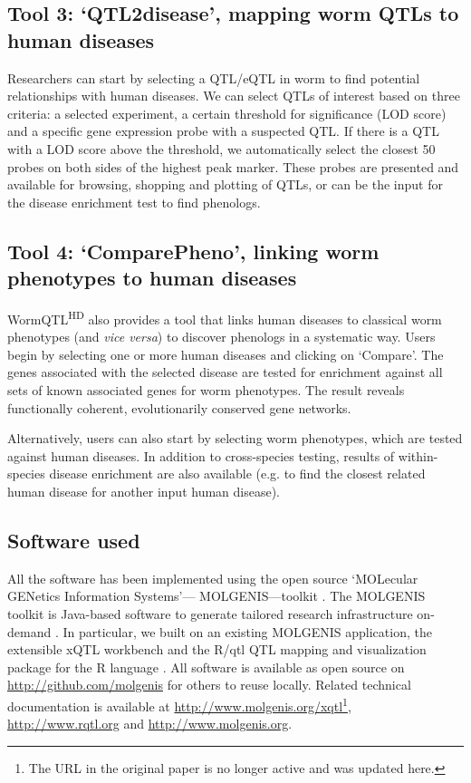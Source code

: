 \subsection[Tool 3: ‘QTL2disease’]{Tool 3: ‘QTL2disease’, mapping worm QTLs to human diseases}
Researchers can start by selecting a QTL/eQTL in worm to find potential relationships with human diseases.
We can select QTLs of interest based on three criteria: a selected experiment, a certain threshold for significance (LOD score) and a specific gene expression probe with a suspected QTL.
If there is a QTL with a LOD score above the threshold, we automatically select the closest 50 probes on both sides of the highest peak marker.
These probes are presented and available for browsing, shopping and plotting of QTLs, or can be the input for the disease enrichment test to find phenologs.

\subsection[Tool 4: ‘ComparePheno’]{Tool 4: ‘ComparePheno’, linking worm phenotypes to human diseases}
WormQTL\textsuperscript{HD} also provides a tool that links human diseases to classical worm phenotypes (and \textsl{vice versa}) to discover phenologs in a systematic way.
Users begin by selecting one or more human diseases and clicking on ‘Compare’.
The genes associated with the selected disease are tested for enrichment against all sets of known associated genes for worm phenotypes. The result reveals functionally coherent, evolutionarily conserved gene networks.

Alternatively, users can also start by selecting worm phenotypes, which are tested against human diseases. In addition to cross-species testing, results of within-species disease enrichment are also available (e.g. to find the closest related human disease for another input human disease).

\subsection{Software used}
All the software has been implemented using the open source ‘MOLecular GENetics Information Systems’— MOLGENIS—toolkit \cite{Swertz_2010a}.
The MOLGENIS toolkit is Java-based software to generate tailored research infrastructure on-demand \cite{Swertz_2007}.
In particular, we built on an existing MOLGENIS application, the extensible xQTL workbench \cite{Arends_2012} and the R/qtl QTL mapping and visualization package for the R language \cite{Broman_2003,Arends_2010}.
All software is available as open source on \url{http://github.com/molgenis} for others to reuse locally.
Related technical documentation is available at \url{http://www.molgenis.org/xqtl}\footnote{The URL in the original paper is no longer active and was updated here.}, \url{http://www.rqtl.org} and \url{http://www.molgenis.org}.



